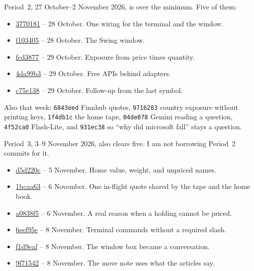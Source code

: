 \documentclass[11pt]{article}
\begin{document}
Period~2, 27 October--2 November 2026, is over the minimum. Five of them:

\begin{itemize}
\item \href{https://github.com/xAssasinSoulx/market-intelligence-agent/commit/3770181a71225ac9e9eda009c9513fde0026fbe9}{3770181} -- 28 October. One wiring for the terminal and the window.
\item \href{https://github.com/xAssasinSoulx/market-intelligence-agent/commit/f1034052dedb7e04a8fbc2f5e3812880d99d6e91}{f103405} -- 28 October. The Swing window.
\item \href{https://github.com/xAssasinSoulx/market-intelligence-agent/commit/fcd3877976f4c873dd4e3c91e2056d3fbe8bb585}{fcd3877} -- 29 October. Exposure from price times quantity.
\item \href{https://github.com/xAssasinSoulx/market-intelligence-agent/commit/4da99b3b67d5395e7de4d11336206fa409d15825}{4da99b3} -- 29 October. Free APIs behind adapters.
\item \href{https://github.com/xAssasinSoulx/market-intelligence-agent/commit/c75e138a55b511dfe801579d0429c3fe0558c82c}{c75e138} -- 29 October. Follow-up from the last symbol.
\end{itemize}

Also that week: \texttt{6843eed} Finnhub quotes, \texttt{9716283} country exposure without printing keys, \texttt{1f4db1c} the home tape, \texttt{04de078} Gemini reading a question, \texttt{4f52ca0} Flash-Lite, and \texttt{931ec38} so ``why did microsoft fall'' stays a question.

Period~3, 3--9 November 2026, also clears five. I am not borrowing Period~2 commits for it.

\begin{itemize}
\item \href{https://github.com/xAssasinSoulx/market-intelligence-agent/commit/d5d220c}{d5d220c} -- 5 November. Home value, weight, and unpriced names.
\item \href{https://github.com/xAssasinSoulx/market-intelligence-agent/commit/1bcaa63}{1bcaa63} -- 6 November. One in-flight quote shared by the tape and the home book.
\item \href{https://github.com/xAssasinSoulx/market-intelligence-agent/commit/a0838f5}{a0838f5} -- 6 November. A real reason when a holding cannot be priced.
\item \href{https://github.com/xAssasinSoulx/market-intelligence-agent/commit/6eef95e}{6eef95e} -- 8 November. Terminal commands without a required slash.
\item \href{https://github.com/xAssasinSoulx/market-intelligence-agent/commit/f1d9eaf}{f1d9eaf} -- 8 November. The window box became a conversation.
\item \href{https://github.com/xAssasinSoulx/market-intelligence-agent/commit/9f71542}{9f71542} -- 8 November. The move note uses what the articles say.
\end{itemize}
\end{document}
